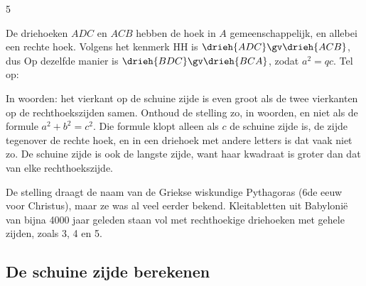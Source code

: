 \begin{theorie}
\begin{alleenvoor}{5}
\begin{bewijs}
\begin{minipage}[t]{.6\linewidth}
De driehoeken $ADC$ en $ACB$ hebben de hoek in $A$ gemeenschappelijk, en allebei een rechte hoek. Volgens het kenmerk HH is $\drieh{ADC} \gv \drieh{ACB}$, dus
Op dezelfde manier is $\drieh{BDC} \gv \drieh{BCA}$, zodat $a^2 = qc$. Tel op:
\end{minipage}\hfill
\begin{minipage}[t]{.36\linewidth}
\vspace{2mm}
\centering
{}
\end{minipage}
\end{bewijs}
\end{alleenvoor}
\end{theorie}

In woorden: het vierkant op de schuine zijde is even groot als de twee vierkanten op de rechthoekszijden samen. Onthoud de stelling zo, in woorden, en niet als de formule $a^2 + b^2 = c^2$. Die formule klopt alleen als $c$ de schuine zijde is, de zijde tegenover de rechte hoek, en in een driehoek met andere letters is dat vaak niet zo. De schuine zijde is ook de langste zijde, want haar kwadraat is groter dan dat van elke rechthoekszijde.

De stelling draagt de naam van de Griekse wiskundige Pythagoras (6de eeuw voor Christus), maar ze was al veel eerder bekend. Kleitabletten uit Babylonië van bijna 4000 jaar geleden staan vol met rechthoekige driehoeken met gehele zijden, zoals 3, 4 en 5.

\begin{oefeningen}
\end{oefeningen}

\subsection{De schuine zijde berekenen}

